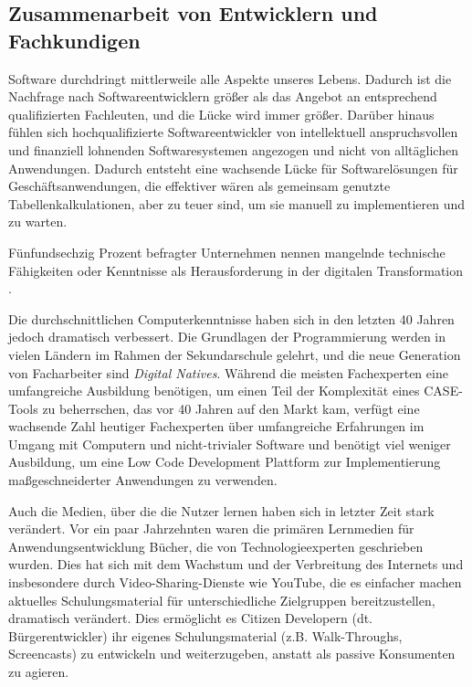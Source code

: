 \documentclass[12pt]{article} %
\begin{document}
	\subsection{Zusammenarbeit von Entwicklern und Fachkundigen} \label{Personalmangel}	
	Software durchdringt mittlerweile alle Aspekte unseres Lebens. Dadurch ist die Nachfrage nach Softwareentwicklern größer als das Angebot an entsprechend qualifizierten Fachleuten, und die Lücke wird immer größer. Darüber hinaus fühlen sich hochqualifizierte Softwareentwickler von intellektuell anspruchsvollen und finanziell lohnenden Softwaresystemen angezogen und nicht von alltäglichen Anwendungen. Dadurch entsteht eine wachsende Lücke für Softwarelösungen für Geschäftsanwendungen, die effektiver wären als gemeinsam genutzte Tabellenkalkulationen, aber zu teuer sind, um sie manuell zu implementieren und zu warten. \autocite{DiRuscio.2022}

	Fünfundsechzig Prozent befragter Unternehmen nennen mangelnde technische Fähigkeiten oder Kenntnisse als Herausforderung in der digitalen Transformation \autocite{EmmaVanPelt.2019}. \newline %
	
	Die durchschnittlichen Computerkenntnisse haben sich in den letzten 40 Jahren jedoch dramatisch verbessert. Die Grundlagen der Programmierung werden in vielen Ländern im Rahmen der Sekundarschule gelehrt, und die neue Generation von Facharbeiter sind \emph{Digital Natives}. Während die meisten Fachexperten eine umfangreiche Ausbildung benötigen, um einen Teil der Komplexität eines CASE-Tools zu beherrschen, das vor 40 Jahren auf den Markt kam, verfügt eine wachsende Zahl heutiger Fachexperten über umfangreiche Erfahrungen im Umgang mit Computern und nicht-trivialer Software und benötigt viel weniger Ausbildung, um eine Low Code Development Plattform zur Implementierung maßgeschneiderter Anwendungen zu verwenden. \autocite{DiRuscio.2022} \newline
	
	Auch die Medien, über die die Nutzer lernen haben sich in letzter Zeit stark verändert. Vor ein paar Jahrzehnten waren die primären Lernmedien für Anwendungsentwicklung Bücher, die von Technologieexperten geschrieben wurden. Dies hat sich mit dem Wachstum und der Verbreitung des Internets und insbesondere durch Video-Sharing-Dienste wie YouTube, die es einfacher machen aktuelles Schulungsmaterial für unterschiedliche Zielgruppen bereitzustellen, dramatisch verändert.
	Dies ermöglicht es Citizen Developern (dt. Bürgerentwickler) ihr eigenes Schulungsmaterial (z.B. Walk-Throughs, Screencasts) zu entwickeln und weiterzugeben, anstatt als passive Konsumenten zu agieren. \autocite{DiRuscio.2022} \newline
	
\end{document}
